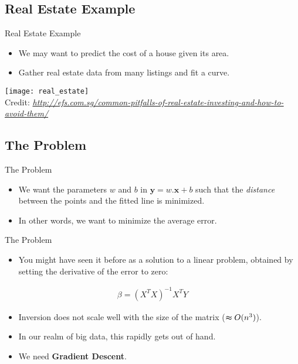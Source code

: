 \subsection{Real Estate Example}
\begin{frame}{Real Estate Example}
	\begin{itemize}
		\item We may want to predict the cost of a house given its area.
		\item Gather real estate data from many listings and fit a curve.
	\end{itemize}
	\begin{center}
	   \texttt{[image: real\_estate]}\\[-1ex]
	   {\tiny Credit: {\itshape \url{http://efs.com.sg/common-pitfalls-of-real-estate-investing-and-how-to-avoid-them/}}}
	\end{center}
\end{frame}

\subsection{The Problem}
\begin{frame}{The Problem}
	\begin{itemize}
		\item We want the parameters $w$ and $b$ in $\boldsymbol{y} = w.\boldsymbol{x} + b$ such that the \textit{distance} between the points and the fitted line is minimized.
		\item In other words, we want to minimize the average error.
		\begin{center}
		\end{center}
	\end{itemize}
\end{frame}

\begin{frame}{The Problem}
	\begin{itemize}
		\item You might have seen it before as a solution to a linear problem, obtained by setting the derivative of the error to zero:
	\end{itemize}
	\begin{gather*}
		\beta = (X^TX)^{-1}X^TY
	\end{gather*}
	\begin{itemize}
		\item Inversion does not scale well with the size of the matrix ($\thickapprox O(n^3)$).
		\item In our realm of big data, this rapidly gets out of hand.
		\item We need \textbf{Gradient Descent}.
	\end{itemize}
\end{frame}


